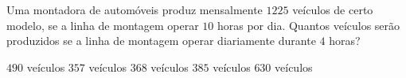 Uma montadora de automóveis produz mensalmente $1225$ veículos de certo modelo, se a linha de montagem operar $10$ horas por dia. Quantos veículos serão produzidos se a linha de montagem operar diariamente durante $4$ horas?

$490$ veículos
$357$ veículos
$368$ veículos
$385$ veículos
$630$ veículos



